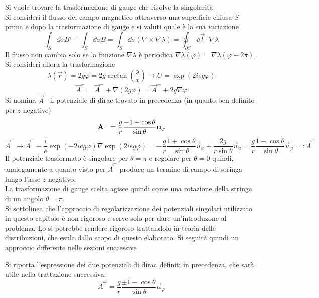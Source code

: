 Si vuole trovare la trasformazione di gauge che risolve la singolarità.\\

Si consideri il flusso del campo magnetico attraverso una superficie chiusa $S$
prima e dopo la trasformazione di gauge e si valuti quale è la sua variazione
$$
   \int_S \dd\sigma B' - \int_S \dd\sigma B = \int_S \dd\sigma (\nabla \times \nabla \lambda)
      = \oint_{\partial S} \dd\vec l \cdot \nabla \lambda
$$
Il flusso non cambia solo se la funzione $\nabla \lambda$ è periodica $\nabla
\lambda(\varphi) = \nabla \lambda( \varphi + 2\pi)$. Si consideri allora la trasformazione
$$
\lambda(\vec r) = 2g\varphi = 2g\arctan\left(\frac{y}{x}\right) \to U = \exp(2ieg\varphi)
$$
\begin{equation}\label{eq:gaugetrasf}
   \vec A ^+ = \vec A ^- + \nabla(2g \varphi) = \vec A ^- + 2g\nabla\varphi
\end{equation}
Si nomina $\vec A^-$ il potenziale di dirac trovato in precedenza (in quanto ben
definito per $z$ negative)
$$
   \vec A^- = \frac{g}{r}\frac{-1 - \cos\theta}{\sin\theta} \vec u _\varphi  \\
$$
$$
  \vec A ^- \mapsto \vec A ^- - \frac{i}{e} \exp( -2ieg\varphi )\nabla \exp(2ieg\varphi ) =
     -\frac{g}{r}\frac{1+\cos\theta}{\sin\theta}\vec u _\varphi
     + \frac{2g}{r\sin\theta}\vec u _\varphi
     = \frac{g}{r}\frac{1 - \cos\theta}{\sin\theta} \vec u _\varphi
     =: \vec A ^+
$$
Il potenziale trasformato è singolare per $\theta = \pi$ e regolare per
$\theta =  0$ quindi, analogamente a quanto visto per $\vec A^-$ produce un termine
di campo di stringa lungo l'asse $z$ negativo.\\
La trasformazione di gauge scelta agisce quindi come una rotazione della stringa
di un angolo $\theta = \pi$.\\

Si sottolinea che l'approccio di regolarizzazione dei potenziali singolari
utilizzato in questo capitolo è non rigoroso e serve solo per dare un'introduzone
al problema. Lo si potrebbe rendere rigoroso trattandolo in teoria delle
distribuzioni, che esula dallo scopo di questo elaborato. Si seguirà quindi
un approccio differente nelle sezioni successive

Si riporta l'espressione dei due potenziali di dirac definiti in precedenza, che
sarà utile nella trattazione successiva.
\begin{equation}\label{eq:localdiracpotential}
  \vec A^\pm = \frac{g}{r}\frac{\pm 1 - \cos\theta}{\sin\theta} \vec u _\varphi
\end{equation}

